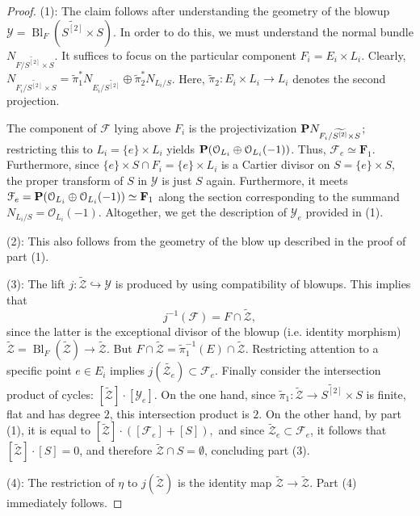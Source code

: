 \documentclass[12pt,reqno]{amsart}
\DeclareMathOperator{\Bl}{Bl}
\renewcommand{\to}{{\longrightarrow}}
\numberwithin{equation}{section}
\renewcommand{\O}{\mathcal O}
\newcommand{\F}{\mathbf F}
\newcommand{\td}{\widetilde}
\begin{document}
\begin{proof}
  (1): The claim follows after understanding the geometry of the
  blowup $\mathcal{Y} = \Bl_{F} \left( \td{S^{[2]}} \times S
  \right)$. In order to do this, we must understand the normal bundle
  $N_{F/ \td{S^{[2]}} \times S }$.  It suffices to focus
  on the particular component $F_{i} = E_{i} \times L_{i}$.  Clearly,
  $N_{F_{i}/ \td{S^{[2]}} \times S } = \td{\pi}_{1}^{*}
  N_{E_{i}/\td{S^{[2]}}} \oplus \td{\pi}_{2}^{*}N_{L_{i}/S}$.  Here,
  $\td{\pi}_{2}: E_{i} \times L_{i} \to L_{i}$ denotes the second
  projection.

  The component of $\mathcal{F}$ lying above $F_{i}$ is the
  projectivization $\P N_{F_{i}/ \td{S^{[2]}} \times S }$; restricting
  this to $L_{i} = \{e\} \times L_{i}$ yields
  $\P (\O_{L_{i}} \oplus \O_{L_{i}}(-1))$.  Thus,
  $\mathcal{F}_{e} \simeq \F_{1}$.  Furthermore, since
  $\{e\} \times S \cap F_{i} = \{e\} \times L_{i}$ is a Cartier
  divisor on $S = \{e\} \times S$, the proper transform of $S$ in
  $\mathcal{Y}$ is just $S$ again.  Furthermore, it meets
  $\mathcal{F}_{e} = \P (\O_{L_{i}} \oplus \O_{L_{i}}(-1)) \simeq
  \F_{1}$ along the section corresponding to the summand
  $N_{L_{i}/S} = \O_{L_{i}}(-1)$. Altogether, we get the description of $\mathcal{Y}_{e}$ provided in (1).

  (2): This also follows from the geometry of the blow up described in
  the proof of part (1).

  (3): The lift $j: \td{\mathcal{Z}} \hookrightarrow \mathcal{Y}$ is
  produced by using compatibility of blowups.  This implies that
  \[j^{-1}(\mathcal{F}) = F \cap \td{\mathcal{Z}},\] since the latter
is the exceptional divisor of the blowup (i.e. identity morphism)
$\td{\mathcal{Z}} = \Bl_{F}(\td{\mathcal{Z}}) \to \td{\mathcal{Z}}$.
But
$F \cap \td{\mathcal{Z}} = \td{\pi}_{1}^{-1}(E) \cap
\td{\mathcal{Z}}$.  Restricting attention to a specific point
$e \in E_{i}$ implies
$j(\td{\mathcal{Z}_{e}}) \subset \mathcal{F}_{e}$. Finally consider
the intersection product of cycles:
$[\td{\mathcal{Z}}] \cdot [\mathcal{Y}_{e}]$.  On the one hand, since
$\td{\pi}_{1}: \td{\mathcal{Z}} \to \td{S^{[2]}} \times S$ is finite,
flat and has degree $2$, this intersection product is $2$.  On the
other hand, by part (1), it is equal to
$[\td{\mathcal{Z}}] \cdot ([\mathcal{F}_{e}]+ [S]),$ and since
$\td{\mathcal{Z}}_{e} \subset \mathcal{F}_{e}$, it follows that
$[\td{\mathcal{Z}}] \cdot [S] = 0$, and therefore
$\td{\mathcal{Z}} \cap S = \emptyset$, concluding part (3).

(4): The restriction of $\eta$ to $j(\td{\mathcal{Z}})$ is the
identity map $\td{\mathcal{Z}} \to \td{\mathcal{Z}}$.  Part (4)
  immediately follows.

\end{proof}
\end{document}
